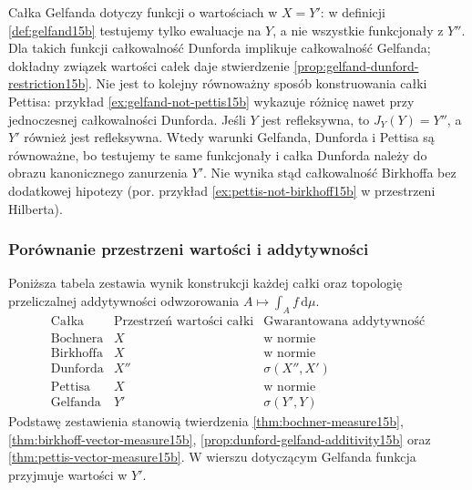 Całka Gelfanda dotyczy funkcji o wartościach w $X=Y'$:
w definicji \ref{def:gelfand15b} testujemy tylko
ewaluacje na $Y$, a nie wszystkie funkcjonały z $Y''$.
Dla takich funkcji całkowalność Dunforda implikuje
całkowalność Gelfanda; dokładny związek wartości
całek daje stwierdzenie \ref{prop:gelfand-dunford-restriction15b}.
Nie jest to kolejny równoważny sposób konstruowania
całki Pettisa: przykład \ref{ex:gelfand-not-pettis15b}
wykazuje różnicę nawet przy jednoczesnej całkowalności
Dunforda. Jeśli $Y$ jest refleksywna, to $J_Y(Y)=Y''$,
a $Y'$ również jest refleksywna. Wtedy warunki
Gelfanda, Dunforda i Pettisa są równoważne,
bo testujemy te same funkcjonały i całka Dunforda
należy do obrazu kanonicznego zanurzenia $Y'$.
Nie wynika stąd całkowalność Birkhoffa bez
dodatkowej hipotezy (por. przykład
\ref{ex:pettis-not-birkhoff15b} w przestrzeni Hilberta).

\subsubsection{Porównanie przestrzeni wartości i addytywności}

Poniższa tabela zestawia wynik konstrukcji każdej całki
oraz topologię przeliczalnej addytywności odwzorowania
$A\mapsto\int_A f\,\mathrm d\mu$.
\[
 \begin{array}{c|c|c}
 \text{Całka}&\text{Przestrzeń wartości całki}
             &\text{Gwarantowana addytywność}\\ \hline
 \text{Bochnera}&X&\text{w normie}\\
 \text{Birkhoffa}&X&\text{w normie}\\
 \text{Dunforda}&X''&\sigma(X'',X')\\
 \text{Pettisa}&X&\text{w normie}\\
 \text{Gelfanda}&Y'&\sigma(Y',Y)
 \end{array}
\]
Podstawę zestawienia stanowią twierdzenia
\ref{thm:bochner-measure15b}, \ref{thm:birkhoff-vector-measure15b},
\ref{prop:dunford-gelfand-additivity15b} oraz
\ref{thm:pettis-vector-measure15b}. W wierszu dotyczącym
Gelfanda funkcja przyjmuje wartości w $Y'$.

